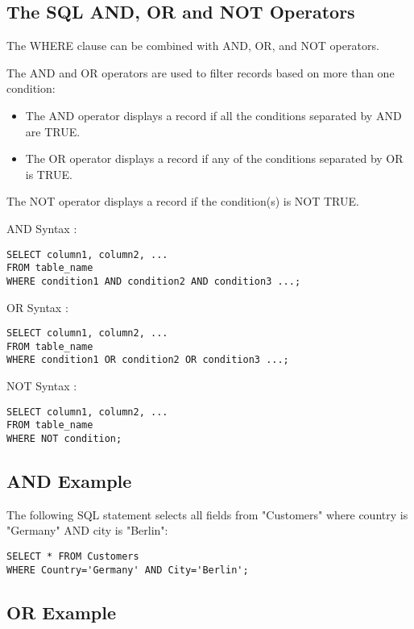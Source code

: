 \documentclass[a4paper,12pt]{article}
\begin{document}
\subsection{The SQL AND, OR and NOT Operators}

The WHERE clause can be combined with AND, OR, and NOT operators.

The AND and OR operators are used to filter records based on more than one condition:

\begin{itemize}
	\item The AND operator displays a record if all the conditions separated by AND are TRUE.
	\item The OR operator displays a record if any of the conditions separated by OR is TRUE.
\end{itemize}

The NOT operator displays a record if the condition(s) is NOT TRUE.

AND Syntax :


\begin{lstlisting}
SELECT column1, column2, ...
FROM table_name
WHERE condition1 AND condition2 AND condition3 ...;
\end{lstlisting}


OR Syntax :

\begin{lstlisting}
SELECT column1, column2, ...
FROM table_name
WHERE condition1 OR condition2 OR condition3 ...;
\end{lstlisting}

NOT Syntax :

\begin{lstlisting}
SELECT column1, column2, ...
FROM table_name
WHERE NOT condition;
\end{lstlisting}


\subsection{AND Example}

The following SQL statement selects all fields from "Customers" where country is "Germany" AND city is "Berlin":


\begin{lstlisting}
SELECT * FROM Customers
WHERE Country='Germany' AND City='Berlin';
\end{lstlisting}


\subsection{OR Example}
\end{document}
